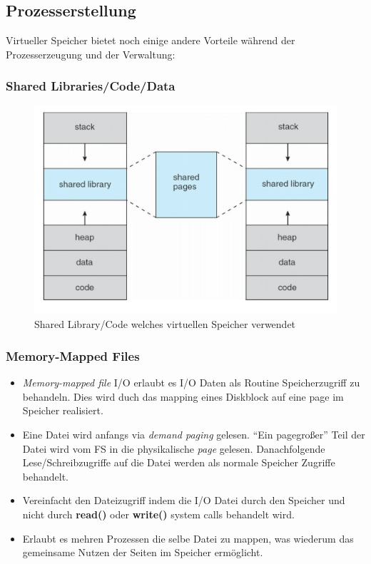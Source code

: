 \documentclass[a4paper]{scrreprt}
\begin{document}
\subsection{Prozesserstellung}
Virtueller Speicher bietet noch einige andere Vorteile während der Prozesserzeugung und der Verwaltung:
\subsubsection{Shared Libraries/Code/Data}
\begin{figure}[ht]
\centering
\includegraphics[scale=0.5]{graphics/sharedlibraries.png}
\caption{Shared Library/Code welches virtuellen Speicher verwendet}
\end{figure}

\subsubsection{Memory-Mapped Files}
\begin{itemize}
\item \textit{Memory-mapped file} I/O erlaubt es I/O Daten als Routine Speicherzugriff zu behandeln. Dies wird duch das mapping eines Diskblock auf eine page im Speicher realisiert.
\item Eine Datei wird anfangs via \textit{demand paging} gelesen. "`Ein pagegroßer"' Teil der Datei wird vom FS in die physikalische \textit{page} gelesen. Danachfolgende Lese/Schreibzugriffe auf die Datei werden als normale Speicher Zugriffe behandelt.
\item Vereinfacht den Dateizugriff indem die I/O Datei durch den Speicher  und nicht durch \textbf{read()} oder \textbf{write()} system calls behandelt wird.
\item Erlaubt es mehren Prozessen die selbe Datei zu mappen, was wiederum das gemeinsame Nutzen der Seiten im Speicher ermöglicht.
\end{itemize}
\end{document}
